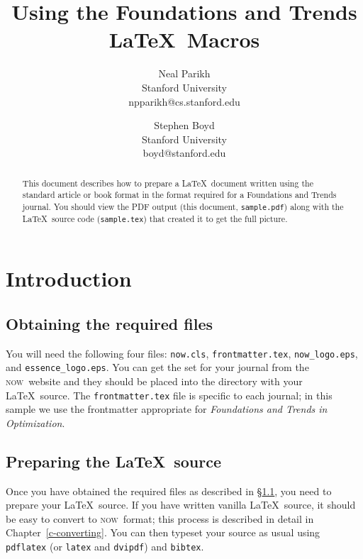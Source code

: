 \documentclass[openany]{now} %
\title{Using the Foundations and Trends \LaTeX\ Macros}
\author{
Neal Parikh \\
Stanford University \\
npparikh@cs.stanford.edu
\and
Stephen Boyd \\
Stanford University \\
boyd@stanford.edu
}
\newcommand{\now}{\textsc{now}}
\begin{document}

\frontmatter  %

\maketitle

\tableofcontents

\mainmatter

\begin{abstract}
This document describes how to prepare a \LaTeX\ document written
using the standard article or book format 
in the format required for a Foundations and Trends journal.
You should view the PDF output (this document, \texttt{sample.pdf})
along with the \LaTeX\ source code (\texttt{sample.tex}) that created it
to get the full picture.
\end{abstract}

\chapter{Introduction}
\label{c-intro} %

\section{Obtaining the required files}
\label{s-files} %

You will need the following four files: 
\texttt{now.cls}, 
\texttt{frontmatter.tex},
\texttt{now\_logo.eps}, and 
\texttt{essence\_logo.eps}.
You can get the set for your journal from the \now\ website and they
should be placed into the directory with your \LaTeX\ source. The
\texttt{frontmatter.tex} file is specific to each journal; in this sample we
use the frontmatter appropriate for \emph{Foundations and Trends in
Optimization}.

\section{Preparing the \LaTeX\ source}

Once you have obtained the required files as described in \S\ref{s-files}, you
need to prepare your \LaTeX\ source.  If you have written vanilla \LaTeX\
source, it should be easy to convert to \now\ format; this process is described
in detail in Chapter~\ref{c-converting}. You can then typeset your source as
usual \citep{Lam:94} using \texttt{pdflatex} (or \texttt{latex} and \texttt{dvipdf})
and \texttt{bibtex}.
\end{document}
